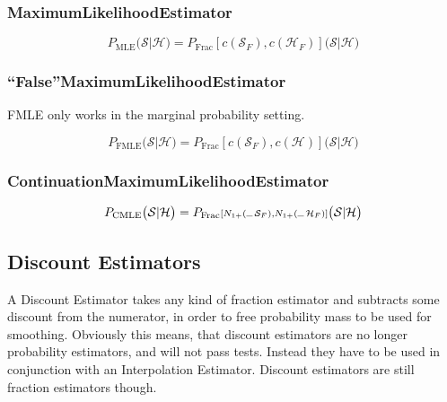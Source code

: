 \documentclass[11pt,a4paper]{article}
\newcommand{\Seq}{\mathcal{S}}
\newcommand{\Hist}{\mathcal{H}}
\newcommand{\SeqF}{\mathcal{S}_F}
\newcommand{\HistF}{\mathcal{H}_F}
\newcommand{\Skp}{\rule{7pt}{.5pt}}
\newcommand{\SmallSkp}{\rule{5pt}{.3pt}}
\begin{document}
  \subsubsection{MaximumLikelihoodEstimator}

  \begin{equation}
    P_\mathrm{MLE}\big(\Seq | \Hist\big) = P_\mathrm{Frac}{\scriptstyle[c(\SeqF) , c(\HistF)]}\big(\Seq | \Hist\big)
  \end{equation}

  \subsubsection{``False''MaximumLikelihoodEstimator}

  FMLE only works in the marginal probability setting.

  \begin{equation}
    P_\mathrm{FMLE}\big(\Seq | \Hist\big) = P_\mathrm{Frac}{\scriptstyle[c(\SeqF) , c(\Hist)]}\big(\Seq | \Hist\big)
  \end{equation}

  \subsubsection{ContinuationMaximumLikelihoodEstimator}

  \begin{equation}
    P_\mathrm{CMLE}\big(\Seq | \Hist\big) = P_\mathrm{Frac}{\scriptstyle[N_{1+}(\SmallSkp \, \SeqF) , N_{1+}(\SmallSkp \, \HistF)]}\big(\Seq | \Hist\big)
  \end{equation}


  \subsection{Discount Estimators}

  A Discount Estimator takes any kind of fraction estimator and subtracts some
  discount from the numerator, in order to free probability mass to be used for
  smoothing. Obviously this means, that discount estimators are no longer
  probability estimators, and will not pass tests. Instead they have to be used
  in conjunction with an Interpolation Estimator. Discount estimators are still
  fraction estimators though.
\end{document}
